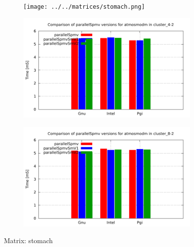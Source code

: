 \begin{figure} [ht!]
    \centering
    \captionsetup{justification=centering, singlelinecheck=false}
    \begin{subfigure}{.25\textwidth}
      \centering
      \hspace*{-1.5cm} 
      \texttt{[image: ../../matrices/stomach.png]}
      \label{fig:stomach_matrix}
    \end{subfigure}%
    \begin{subfigure}{.37\textwidth}
      \centering
      \hspace*{-1.0cm} 
      \includegraphics[page=8, width=0.95\linewidth]{../plots/myCluster_4-2.pdf}
      \label{fig:stomach_performance}
    \end{subfigure}
    \begin{subfigure}{.37\textwidth}
      \centering
      \hspace*{-1.0cm} 
      \includegraphics[page=8, width=0.95\linewidth]{../plots/myCluster_8-2.pdf}
      \label{fig:stomach_performance}
    \end{subfigure}
\caption{Matrix: stomach}
\label{fig:stomach}
\end{figure}

